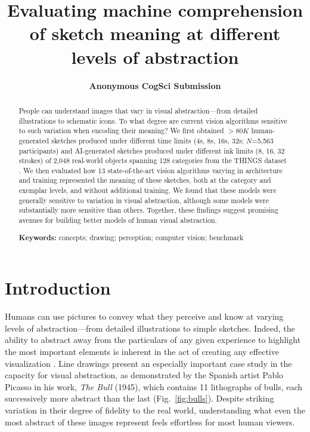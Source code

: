 \documentclass[10pt,letterpaper]{article}
\author{\bf Anonymous CogSci Submission}
\title{Evaluating machine comprehension of sketch meaning at different levels of abstraction}
\begin{document}


\maketitle
\begin{abstract}

People can understand images that vary in visual abstraction---from detailed illustrations to schematic icons. 
To what degree are current vision algorithms sensitive to such variation when encoding their meaning? 
We first obtained $>80K$ human-generated sketches produced under different time limits (4s, 8s, 16s, 32s; $N$=5,563 participants) and AI-generated sketches \cite{vinker2022clipasso} produced under different ink limits (8, 16, 32 strokes)  of 2,048 real-world objects spanning 128 categories from the THINGS dataset \cite{hebart2019things}.
We then evaluated how 13 state-of-the-art vision algorithms varying in architecture and training represented the meaning of these sketches, both at the category and exemplar levels, and without additional training.
We found that these models were generally sensitive to variation in visual abstraction, although some models were substantially more sensitive than others.
Together, these findings suggest promising avenues for building better models of human visual abstraction. 

\textbf{Keywords:} 
concepts; drawing; perception; computer vision; benchmark
\end{abstract}


\section{Introduction}

Humans can use pictures to convey what they perceive and know at varying levels of abstraction---from detailed illustrations to simple sketches.
Indeed, the ability to abstract away from the particulars of any given experience to highlight the most important elements is inherent in the act of creating any effective visualization \cite{viola2017pondering, chen2020foundations,mccloud1998understanding, mi2009abstraction, nan2011conjoining}.
Line drawings present an especially important case study in the capacity for visual abstraction, as demonstrated by the Spanish artist Pablo Picasso in his work, \textit{The Bull} (1945), which contains 11 lithographs of bulls, each successively more abstract than the last (Fig.~\ref{fig:bulls}).
Despite striking variation in their degree of fidelity to the real world, understanding what even the most abstract of these images represent feels effortless for most human viewers.
\end{document}
